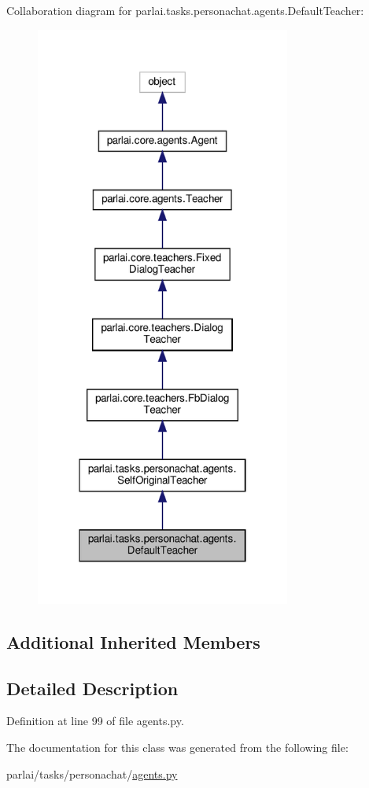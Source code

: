 Collaboration diagram for parlai.\+tasks.\+personachat.\+agents.\+Default\+Teacher\+:
\nopagebreak
\begin{figure}[H]
\begin{center}
\leavevmode
\includegraphics[width=238pt]{classparlai_1_1tasks_1_1personachat_1_1agents_1_1DefaultTeacher__coll__graph}
\end{center}
\end{figure}
\subsection*{Additional Inherited Members}


\subsection{Detailed Description}


Definition at line 99 of file agents.\+py.



The documentation for this class was generated from the following file\+:\begin{DoxyCompactItemize}
\item 
parlai/tasks/personachat/\hyperlink{parlai_2tasks_2personachat_2agents_8py}{agents.\+py}\end{DoxyCompactItemize}
